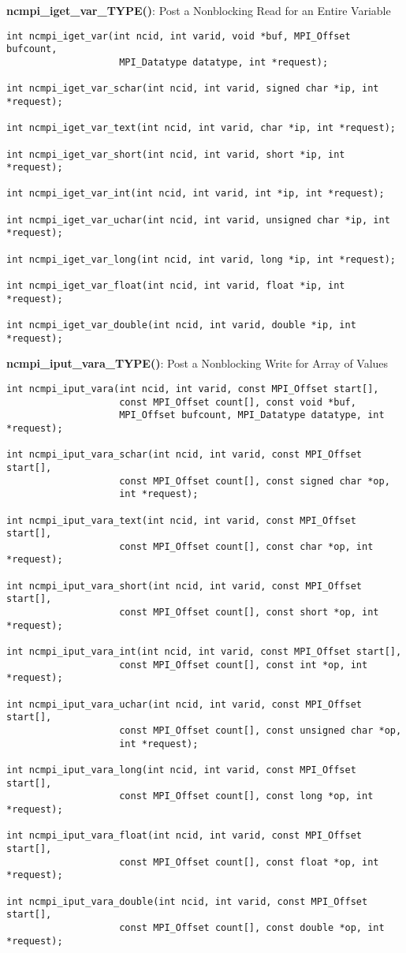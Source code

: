 {\bf ncmpi\_iget\_var\_TYPE()}: Post a Nonblocking Read for an Entire Variable

\begin{verbatim}
int ncmpi_iget_var(int ncid, int varid, void *buf, MPI_Offset bufcount,
                    MPI_Datatype datatype, int *request);

int ncmpi_iget_var_schar(int ncid, int varid, signed char *ip, int *request);

int ncmpi_iget_var_text(int ncid, int varid, char *ip, int *request);

int ncmpi_iget_var_short(int ncid, int varid, short *ip, int *request);

int ncmpi_iget_var_int(int ncid, int varid, int *ip, int *request);

int ncmpi_iget_var_uchar(int ncid, int varid, unsigned char *ip, int *request);

int ncmpi_iget_var_long(int ncid, int varid, long *ip, int *request);

int ncmpi_iget_var_float(int ncid, int varid, float *ip, int *request);

int ncmpi_iget_var_double(int ncid, int varid, double *ip, int *request);
\end{verbatim}


{\bf ncmpi\_iput\_vara\_TYPE()}: Post a Nonblocking Write for Array of Values

\begin{verbatim}
int ncmpi_iput_vara(int ncid, int varid, const MPI_Offset start[],
                    const MPI_Offset count[], const void *buf,
                    MPI_Offset bufcount, MPI_Datatype datatype, int *request);

int ncmpi_iput_vara_schar(int ncid, int varid, const MPI_Offset start[],
                    const MPI_Offset count[], const signed char *op,
                    int *request);

int ncmpi_iput_vara_text(int ncid, int varid, const MPI_Offset start[],
                    const MPI_Offset count[], const char *op, int *request);

int ncmpi_iput_vara_short(int ncid, int varid, const MPI_Offset start[],
                    const MPI_Offset count[], const short *op, int *request);

int ncmpi_iput_vara_int(int ncid, int varid, const MPI_Offset start[],
                    const MPI_Offset count[], const int *op, int *request);

int ncmpi_iput_vara_uchar(int ncid, int varid, const MPI_Offset start[],
                    const MPI_Offset count[], const unsigned char *op,
                    int *request);

int ncmpi_iput_vara_long(int ncid, int varid, const MPI_Offset start[],
                    const MPI_Offset count[], const long *op, int *request);

int ncmpi_iput_vara_float(int ncid, int varid, const MPI_Offset start[],
                    const MPI_Offset count[], const float *op, int *request);

int ncmpi_iput_vara_double(int ncid, int varid, const MPI_Offset start[],
                    const MPI_Offset count[], const double *op, int *request);
\end{verbatim}


